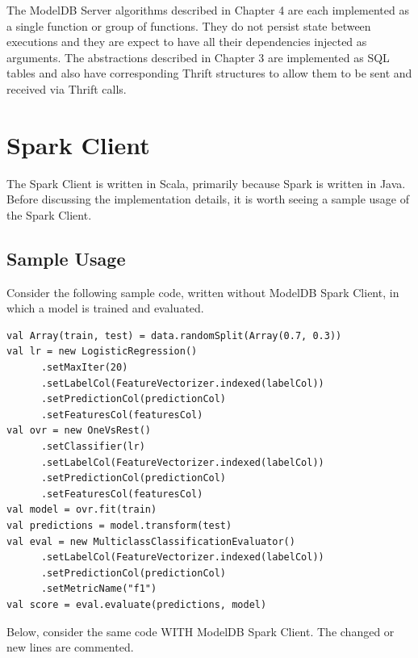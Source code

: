 The ModelDB Server algorithms described in Chapter 4 are each implemented as a single function
or group of functions. They do not persist state between executions and they are expect to have all
their dependencies injected as arguments. The abstractions described in Chapter 3 are implemented as 
SQL tables and also have corresponding Thrift structures to allow them to be sent and received via Thrift
calls.

\section{Spark Client}
The Spark Client is written in Scala, primarily because Spark is written in Java.
Before discussing the implementation details, it is worth seeing a sample usage
of the Spark Client.

\subsection{Sample Usage}
Consider the following sample code, written without ModelDB Spark Client, 
in which a model is trained and evaluated.

\begin{verbatim}
val Array(train, test) = data.randomSplit(Array(0.7, 0.3))
val lr = new LogisticRegression()
      .setMaxIter(20)
      .setLabelCol(FeatureVectorizer.indexed(labelCol))
      .setPredictionCol(predictionCol)
      .setFeaturesCol(featuresCol)
val ovr = new OneVsRest()
      .setClassifier(lr)
      .setLabelCol(FeatureVectorizer.indexed(labelCol))
      .setPredictionCol(predictionCol)
      .setFeaturesCol(featuresCol)
val model = ovr.fit(train)
val predictions = model.transform(test)
val eval = new MulticlassClassificationEvaluator()
      .setLabelCol(FeatureVectorizer.indexed(labelCol))
      .setPredictionCol(predictionCol)
      .setMetricName("f1")
val score = eval.evaluate(predictions, model)
\end{verbatim}

Below, consider the same code WITH ModelDB Spark Client. The changed or
new lines are commented.

